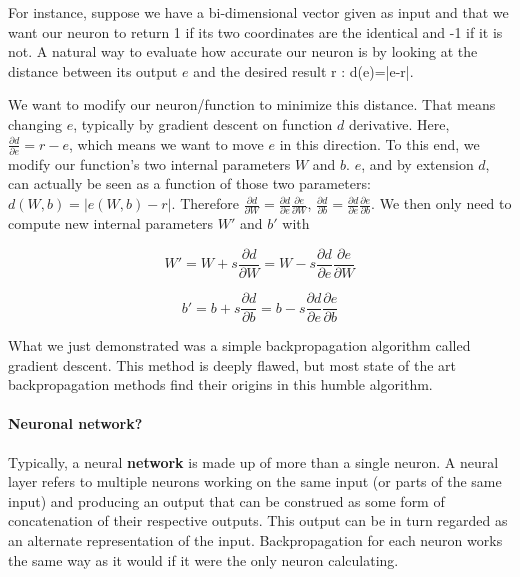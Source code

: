 \documentclass[conference]{IEEEtran}
\begin{document}
For instance, suppose we have a bi-dimensional vector given as input and that we
want our neuron to return 1 if its two coordinates are the identical and -1 if
it is not. A natural way to evaluate how accurate our neuron is by looking at the
distance between its output $e$ and the desired result r : d(e)=|e-r|.

We want to modify our neuron/function to minimize this distance. That means
changing $e$, typically by gradient descent on function $d$ derivative. Here,
$\frac{\partial d}{\partial e} = r-e$, which means we want to \og move\fg{} $e$ in this
direction. To this end, we modify our function's two internal parameters $W$ and
$b$. $e$, and by extension $d$, can actually be seen as a function of those two
parameters: $d(W,b)=|e(W,b)-r|$. Therefore $\frac{\partial d}{\partial W}
   = \frac{\partial d}{\partial e}\frac{\partial e}{\partial W}$,
$\frac{\partial d}{\partial b}
   = \frac{\partial d}{\partial e}\frac{\partial e}{\partial b}$. We then only
   need to compute new internal parameters $W'$ and $b'$ with 

\begin{equation}
     W'=W + s\frac{\partial d}{\partial W}=W-s\frac{\partial d}{\partial e}\frac{\partial e}{\partial W}
\end{equation}

\begin{equation}
     b'=b + s\frac{\partial d}{\partial b}=b-s\frac{\partial d}{\partial e}\frac{\partial e}{\partial b}
\end{equation}

What we just demonstrated was a simple backpropagation algorithm called gradient
descent. This method is deeply flawed, but most state of the art backpropagation
methods find their origins in this humble algorithm.

\paragraph{Neuronal network?}

Typically, a neural \textbf{network} is made up of more than a single neuron. A
neural layer refers to multiple neurons working on the same input (or parts of
the same input) and producing an output that can be construed as some form of
concatenation of their respective outputs. This output can be in turn regarded
as an alternate representation of the input. Backpropagation for each neuron
works the same way as it would if it were the only neuron calculating.
\end{document}

